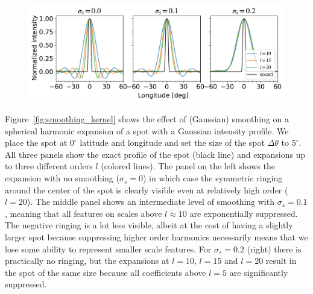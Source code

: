 \documentclass[modern]{aastex62}
\begin{document}
\begin{figure}[t!]
    \begin{centering}
    \includegraphics[width=1.\linewidth]{figures/smoothing_kernel.pdf}
    \end{centering}
\end{figure}


Figure~\ref{fig:smoothing_kernel} shows the effect of (Gaussian) smoothing on a spherical harmonic expansion of a spot with a Gaussian intensity profile.
We place the spot at $0^\circ$ latitude and longitude and set the size of the spot $\Delta\theta$ to $5^\circ$.
All three panels show the exact profile of the spot (black line) and expansions up to three different orders $l$ (colored lines).
The panel on the left shows the expansion with no smoothing ($\sigma_s=0$) in which case the symmetric ringing around the center of the spot is clearly visible even at relatively high order ($l=20$).
The middle panel shows an intermediate level of smoothing with $\sigma_s=0.1$, meaning that all features on scales above $l\approx 10$ are exponentially suppressed.
The negative ringing is a lot less visible, albeit at the cost of having a slightly larger spot because suppressing higher order harmonics necessarily means that we lose some ability to represent smaller scale features.
For $\sigma_s=0.2$ (right) there is practically no ringing, but the expansions at $l=10$, $l=15$ and $l=20$ result in the spot of the same size because all coefficients above $l=5$ are significantly suppressed.
\end{document}

